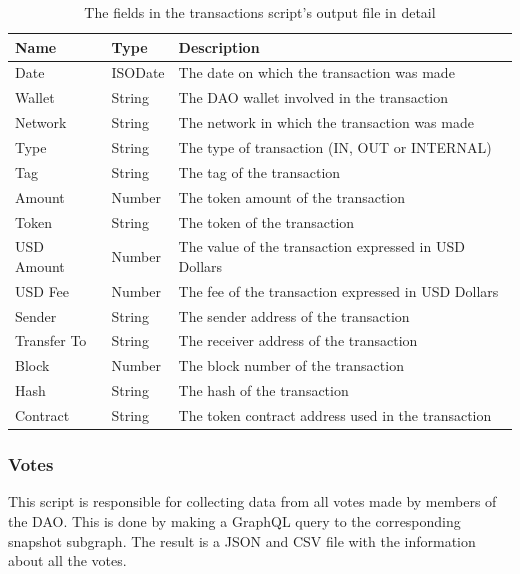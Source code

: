 \documentclass[MSE,Master,english]{twbook}%
\begin{document}
\begin{table}[H]
  \centering
  \begin{tabularx}{\textwidth}{|l|l|X|}
  \hline
  \textbf{Name} & \textbf{Type} & \textbf{Description}                          \\ \hline
  Date        & ISODate & The date on which the transaction was made            \\ \hline
  Wallet      & String  & The DAO wallet involved in the transaction            \\ \hline
  Network     & String  & The network in which the transaction was made         \\ \hline
  Type        & String  & The type of transaction (IN, OUT or INTERNAL)         \\ \hline
  Tag         & String  & The tag of the transaction                            \\ \hline
  Amount      & Number  & The token amount of the transaction                   \\ \hline
  Token       & String  & The token of the transaction                          \\ \hline
  USD Amount  & Number  & The value of the transaction expressed in USD Dollars \\ \hline
  USD Fee     & Number  & The fee of the transaction expressed in USD Dollars   \\ \hline
  Sender      & String  & The sender address of the transaction                 \\ \hline
  Transfer To & String  & The receiver address of the transaction               \\ \hline
  Block       & Number  & The block number of the transaction                   \\ \hline
  Hash        & String  & The hash of the transaction                           \\ \hline
  Contract    & String  & The token contract address used in the transaction    \\ \hline
  \end{tabularx}
  \caption{The fields in the transactions script's output file in detail}
  \label{table:transactions}
\end{table}

\subsubsection{Votes\label{subsec_votes}}
This script is responsible for collecting data from all votes made by members of the DAO. This is done by making a GraphQL query to the corresponding snapshot subgraph. The result is a JSON and CSV file with the information about all the votes. \\
\end{document}
